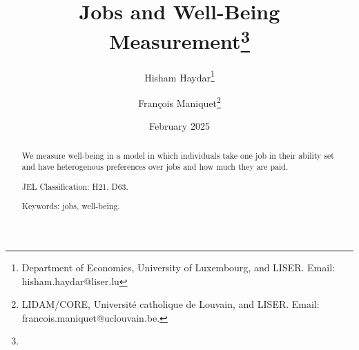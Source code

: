 \documentclass[12pt,thmsb]{article}
\begin{document}
\title{Jobs and Well-Being Measurement\thanks{}}
\author{Hisham Haydar\thanks{Department of Economics, University of Luxembourg, and LISER. Email: hisham.haydar@liser.lu} \and Fran\c{c}ois Maniquet\thanks{LIDAM/CORE, Universit\'{e} catholique de Louvain, and LISER. Email: francois.maniquet@uclouvain.be.}}
\date{February 2025}
\maketitle

\begin{abstract}
We measure well-being in a model in which individuals take one job in their ability set and have heterogenous preferences over jobs and how much they are paid.

JEL Classification: H21, D63.

Keywords: jobs, well-being.
\end{abstract}





\end{document}
